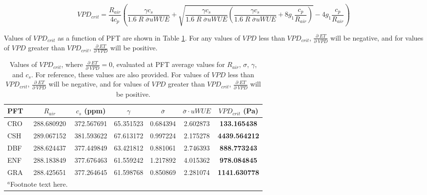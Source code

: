 \documentclass[draft,linenumbers]{agujournal}
\begin{document}
\begin{linenomath*}
  \begin{equation}
VPD_{crit} = \frac{R_{air}}{4 c_p} \left( \frac{\gamma c_s}{1.6\; R \; \overline{\sigma} uWUE} + \sqrt{\frac{\gamma c_s}{1.6\; R \; \overline{\sigma} uWUE}\left( \frac{\gamma c_s}{1.6\; R \; \overline{\sigma} uWUE} + 8 g_1 \frac{c_p}{R_{air}}\right)} - 4 g_1 \frac{c_p}{R_{air}} \right)
\label{vpd_min_et}
  \end{equation}
\end{linenomath*}

Values of $VPD_{crit}$ as a function of PFT are shown in Table \ref{vpd_crit}. For any values of $VPD$ less than $VPD_{crit}$, $\frac{\partial \; ET}{\partial \; VPD}$ will be negative, and for values of $VPD$ greater than $VPD_{crit}$, $\frac{\partial \; ET}{\partial \; VPD}$ will be positive.


\begin{table}
  \label{vpd_crit}
\caption{Values of $VPD_{crit}$, where $\frac{\partial \; ET}{\partial \; VPD} = 0$, evaluated at PFT average values for $R_{air}$, $\sigma$, $\gamma$, and $c_s$. For reference, these values are also provided. For values of $VPD$ less than $VPD_{crit}$, $\frac{\partial \; ET}{\partial \; VPD}$ will be negative, and for values of $VPD$ greater than $VPD_{crit}$, $\frac{\partial \; ET}{\partial \; VPD}$ will be positive.}
\centering
\begin{tabular}{l c c c c c c}
  \hline
  PFT & $R_{air}$ & $c_s$ (ppm) & $\gamma$ & $\overline{\sigma}$ & $\overline{\sigma} \cdot uWUE$ & \textbf{$VPD_{crit}$ (Pa)} \\
  \hline
  CRO &  288.680920 & 372.567691& 65.351523& 0.684394&       2.602873&  \textbf{133.165438} \\
  CSH &   289.067152& 381.593622& 67.613172& 0.997224&       2.175278& \textbf{4439.564212} \\
  DBF &   288.624437& 377.449849& 63.421812& 0.881061&       2.746393&  \textbf{888.773243} \\
  ENF &  288.183849& 377.676463& 61.559242& 1.217892&       4.015362&  \textbf{978.084845} \\
  GRA &  288.425651& 377.264645& 61.598768& 0.850869&       2.281074& \textbf{1141.630778} \\
\hline
\multicolumn{2}{l}{$^{a}$Footnote text here.}
\end{tabular}
\end{table}
\end{document}
